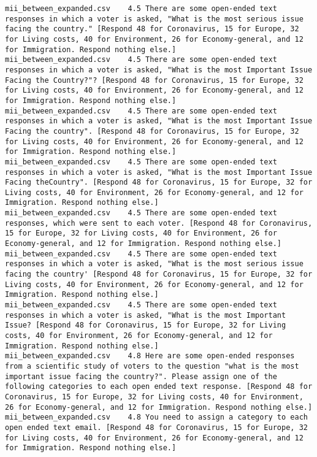 \begin{lstlisting}[label=lst:promptvariants]
mii_between_expanded.csv	4.5	There are some open-ended text responses in which a voter is asked, "What is the most serious issue facing the country." [Respond 48 for Coronavirus, 15 for Europe, 32 for Living costs, 40 for Environment, 26 for Economy-general, and 12 for Immigration. Respond nothing else.]
mii_between_expanded.csv	4.5	There are some open-ended text responses in which a voter is asked, "What is the most Important Issue Facing the Country?"? [Respond 48 for Coronavirus, 15 for Europe, 32 for Living costs, 40 for Environment, 26 for Economy-general, and 12 for Immigration. Respond nothing else.]
mii_between_expanded.csv	4.5	There are some open-ended text responses in which a voter is asked, "What is the most Important Issue Facing the country". [Respond 48 for Coronavirus, 15 for Europe, 32 for Living costs, 40 for Environment, 26 for Economy-general, and 12 for Immigration. Respond nothing else.]
mii_between_expanded.csv	4.5	There are some open-ended text responses in which a voter is asked, "What is the most Important Issue Facing theCountry". [Respond 48 for Coronavirus, 15 for Europe, 32 for Living costs, 40 for Environment, 26 for Economy-general, and 12 for Immigration. Respond nothing else.]
mii_between_expanded.csv	4.5	There are some open-ended text responses, which were sent to each voter. [Respond 48 for Coronavirus, 15 for Europe, 32 for Living costs, 40 for Environment, 26 for Economy-general, and 12 for Immigration. Respond nothing else.]
mii_between_expanded.csv	4.5	There are some open-ended text responses in which a voter is asked, "What is the most serious issue facing the country' [Respond 48 for Coronavirus, 15 for Europe, 32 for Living costs, 40 for Environment, 26 for Economy-general, and 12 for Immigration. Respond nothing else.]
mii_between_expanded.csv	4.5	There are some open-ended text responses in which a voter is asked, "What is the most Important Issue? [Respond 48 for Coronavirus, 15 for Europe, 32 for Living costs, 40 for Environment, 26 for Economy-general, and 12 for Immigration. Respond nothing else.]
mii_between_expanded.csv	4.8	Here are some open-ended responses from a scientific study of voters to the question "what is the most important issue facing the country?". Please assign one of the following categories to each open ended text response. [Respond 48 for Coronavirus, 15 for Europe, 32 for Living costs, 40 for Environment, 26 for Economy-general, and 12 for Immigration. Respond nothing else.]
mii_between_expanded.csv	4.8	You need to assign a category to each open ended text email. [Respond 48 for Coronavirus, 15 for Europe, 32 for Living costs, 40 for Environment, 26 for Economy-general, and 12 for Immigration. Respond nothing else.]

\end{lstlisting}
